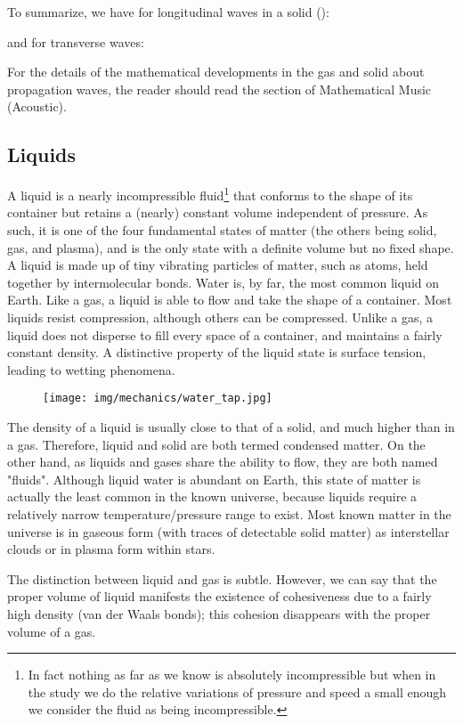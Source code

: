 	To summarize, we have for longitudinal waves in a solid ():
	
	and for transverse waves:
	
	For the details of the mathematical developments in the gas and solid about propagation waves, the reader should read the section of Mathematical Music (Acoustic).
	
	\pagebreak	
	\subsection{Liquids}
	A liquid is a nearly incompressible fluid\footnote{In fact nothing as far as we know is absolutely incompressible but when in the study we do the relative variations of pressure and speed a small enough we consider the fluid as being incompressible.} that conforms to the shape of its container but retains a (nearly) constant volume independent of pressure. As such, it is one of the four fundamental states of matter (the others being solid, gas, and plasma), and is the only state with a definite volume but no fixed shape. A liquid is made up of tiny vibrating particles of matter, such as atoms, held together by intermolecular bonds. Water is, by far, the most common liquid on Earth. Like a gas, a liquid is able to flow and take the shape of a container. Most liquids resist compression, although others can be compressed. Unlike a gas, a liquid does not disperse to fill every space of a container, and maintains a fairly constant density. A distinctive property of the liquid state is surface tension, leading to wetting phenomena.
	\begin{figure}[H]
		\centering
		\texttt{[image: img/mechanics/water\_tap.jpg]}
	\end{figure}
	The density of a liquid is usually close to that of a solid, and much higher than in a gas. Therefore, liquid and solid are both termed condensed matter. On the other hand, as liquids and gases share the ability to flow, they are both named "fluids". Although liquid water is abundant on Earth, this state of matter is actually the least common in the known universe, because liquids require a relatively narrow temperature/pressure range to exist. Most known matter in the universe is in gaseous form (with traces of detectable solid matter) as interstellar clouds or in plasma form within stars.
	
	The distinction between liquid and gas is subtle. However, we can say that the proper volume of liquid manifests the existence of cohesiveness due to a fairly high density (van der Waals bonds); this cohesion disappears with the proper volume of a gas.


